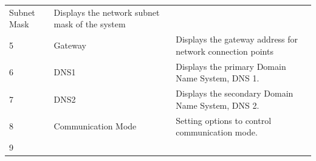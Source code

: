 \begin{longtable}[]{@{}lll@{}}
\begin{minipage}[t]{0.23\columnwidth}
Subnet Mask\strut
\end{minipage} & \begin{minipage}[t]{0.65\columnwidth}\raggedright
Displays the network subnet mask of the system\strut
\end{minipage}\tabularnewline
\begin{minipage}[t]{0.04\columnwidth}\raggedright
5\strut
\end{minipage} & \begin{minipage}[t]{0.23\columnwidth}\raggedright
Gateway\strut
\end{minipage} & \begin{minipage}[t]{0.65\columnwidth}\raggedright
Displays the gateway address for network connection points\strut
\end{minipage}\tabularnewline
\begin{minipage}[t]{0.04\columnwidth}\raggedright
6\strut
\end{minipage} & \begin{minipage}[t]{0.23\columnwidth}\raggedright
DNS1\strut
\end{minipage} & \begin{minipage}[t]{0.65\columnwidth}\raggedright
Displays the primary Domain Name System, DNS 1.\strut
\end{minipage}\tabularnewline
\begin{minipage}[t]{0.04\columnwidth}\raggedright
7\strut
\end{minipage} & \begin{minipage}[t]{0.23\columnwidth}\raggedright
DNS2\strut
\end{minipage} & \begin{minipage}[t]{0.65\columnwidth}\raggedright
Displays the secondary Domain Name System, DNS 2.\strut
\end{minipage}\tabularnewline
\begin{minipage}[t]{0.04\columnwidth}\raggedright
8\strut
\end{minipage} & \begin{minipage}[t]{0.23\columnwidth}\raggedright
Communication Mode\strut
\end{minipage} & \begin{minipage}[t]{0.65\columnwidth}\raggedright
Setting options to control communication mode.\strut
\end{minipage}\tabularnewline
\begin{minipage}[t]{0.04\columnwidth}\raggedright
9\strut
\end{minipage} & \begin{minipage}[t]{0.23\columnwidth}\raggedright

\end{minipage}
\end{longtable}
